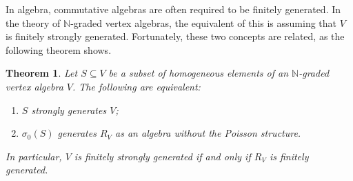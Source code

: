 \documentclass[a4paper, 12pt, reqno]{amsart}
\newtheorem{theorem}{Theorem}[section]
\theoremstyle{remark}
\begin{document}
In algebra, commutative algebras are often required to be finitely generated.
In the theory of $\mathbb{N}$-graded vertex algebras, the equivalent of this is assuming that $V$ is finitely strongly generated.
Fortunately, these two concepts are related, as the following theorem shows.

\begin{theorem}
  \label{thr:52}
  Let $S \subseteq V$ be a subset of homogeneous elements of an $\mathbb{N}$-graded vertex algebra $V$.
  The following are equivalent:
  \begin{enumerate}
  \item $S$ strongly generates $V$;
  \item $\sigma_0(S)$ generates $R_V$ as an algebra without the Poisson structure.
  \end{enumerate}
  In particular, $V$ is finitely strongly generated if and only if $R_V$ is finitely generated.
\end{theorem}
\end{document}
